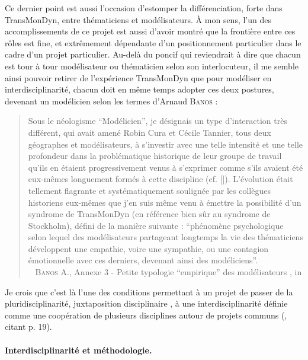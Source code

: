 Ce dernier point est aussi l'occasion d'estomper la différenciation, forte dans TransMonDyn, entre \og thématiciens\fg{} et \og modélisateurs\fg{}.
À mon sens, l'un des accomplissements de ce projet est aussi d'avoir montré que la frontière entre ces \og rôles\fg{} est fine, et extrêmement dépendante d'un positionnement particulier dans le cadre d'un projet particulier.
Au-delà du poncif qui reviendrait à dire que chacun est tour à tour modélisateur ou thématicien selon son interlocuteur, il me semble ainsi pouvoir retirer de l'expérience TransMonDyn que pour modéliser en interdisciplinarité, chacun doit en même temps adopter ces deux postures, devenant un \og modélicien\fg{} selon les termes d'Arnaud \textsc{Banos} :
\begin{quotation}
	\noindent \og Sous le néologisme “Modélicien”, je désignais un type d'interaction très différent, qui avait amené Robin Cura et Cécile Tannier, tous deux géographes et modélisateurs, à s'investir avec une telle intensité et une telle profondeur dans la problématique historique de leur groupe de travail qu'ils en étaient progressivement venus à s'exprimer comme s'ils avaient été eux-mêmes longuement formés à cette discipline (cf. [\cite{cura_transition_2017}]).
	L'évolution était tellement flagrante et systématiquement soulignée par les collègues historiens eux-mêmes que j'en suis même venu à émettre la possibilité d'un syndrome de TransMonDyn (en référence bien sûr au syndrome de Stockholm), défini de la manière suivante :
	“phénomène psychologique selon lequel des modélisateurs partageant longtemps la vie des thématiciens développent une empathie, voire une sympathie, ou une contagion émotionnelle avec ces derniers, devenant ainsi des modéliciens”.
	\fg{} \\
	\mbox{}~ \textsc{Banos} A., \og Annexe 3 - Petite typologie “empirique” des modélisateurs \fg{}, in \textcite[484]{ouriachi_lelaboration_2017}
\end{quotation}
Je crois que c'est là l'une des conditions permettant à un projet de passer de la pluridisciplinarité, \og juxtaposition disciplinaire\fg{} \autocite[14]{gravier_deux_2018}, à une interdisciplinarité définie comme une \og coopération de plusieurs disciplines autour de projets communs\fg{} (\cite[14]{gravier_deux_2018}, citant \textcite{AERES2014} p. 19).

\paragraph{Interdisciplinarité et méthodologie.}\label{par:interdisciplinarite-methodo}

